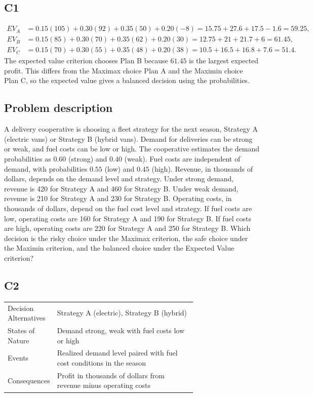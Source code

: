 \begin{ExamProblems}
		\subsection*{C1}
		\[
		\begin{aligned}
		EV_A &= 0.15(105)+0.30(92)+0.35(50)+0.20(-8)=15.75+27.6+17.5-1.6=59.25,\\
		EV_B &= 0.15(85)+0.30(70)+0.35(62)+0.20(30)=12.75+21+21.7+6=61.45,\\
		EV_C &= 0.15(70)+0.30(55)+0.35(48)+0.20(38)=10.5+16.5+16.8+7.6=51.4.
		\end{aligned}
		\]
		The expected value criterion chooses Plan B because $61.45$ is the largest expected profit. This differs from the Maximax choice Plan A and the Maximin choice Plan C, so the expected value gives a balanced decision using the probabilities.

		\item
		\subsection*{Problem description}
		A delivery cooperative is choosing a fleet strategy for the next season, Strategy A (electric vans)
		or Strategy B (hybrid vans). Demand for deliveries can be strong or weak, and fuel costs can be low or high. The cooperative estimates the demand probabilities as $0.60$ (strong) and $0.40$ (weak). Fuel costs are independent of demand, with probabilities $0.55$ (low) and $0.45$ (high). Revenue, in thousands of dollars, depends on the demand level and strategy. Under strong demand, revenue is 420 for Strategy A and 460 for Strategy B. Under weak demand, revenue is 210 for Strategy A and 230 for Strategy B. Operating costs, in thousands of dollars, depend on the fuel cost level and strategy. If fuel costs are low, operating costs are 160 for Strategy A and 190 for Strategy B. If fuel costs are high, operating costs are 220 for Strategy A and 250 for Strategy B. Which decision is the risky choice under the Maximax criterion, the safe choice under the Maximin criterion, and the balanced choice under the Expected Value criterion?

		\subsection*{C2}
		\begin{center}
			\begin{tabular}{l p{0.74\linewidth}}
				\toprule
				Decision Alternatives & Strategy A (electric), Strategy B (hybrid) \\
				States of Nature & Demand strong, weak with fuel costs low or high \\
				Events & Realized demand level paired with fuel cost conditions in the season \\
				Consequences & Profit in thousands of dollars from revenue minus operating costs \\
				\bottomrule
			\end{tabular}
		\end{center}


\end{ExamProblems}
